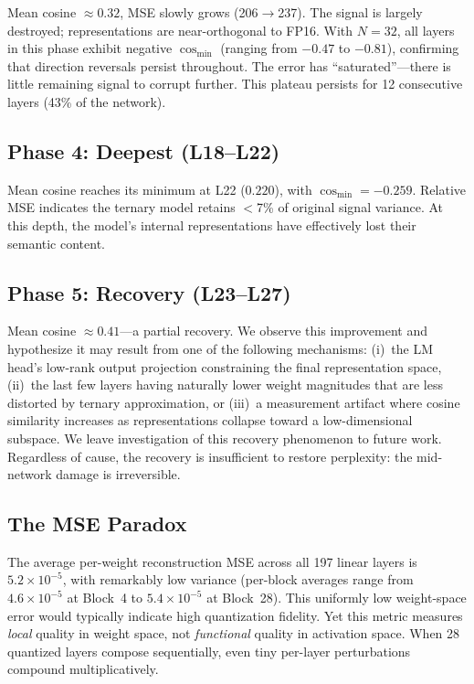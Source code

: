 \documentclass[10pt,a4paper]{article}
\begin{document}
Mean cosine $\approx 0.32$, MSE slowly grows (206$\to$237).
The signal is largely destroyed; representations are near-orthogonal to FP16.
With $N{=}32$, all layers in this phase exhibit negative $\cos_{\min}$ (ranging from $-0.47$ to $-0.81$), confirming that direction reversals persist throughout.
The error has ``saturated''---there is little remaining signal to corrupt further.
This plateau persists for 12 consecutive layers (43\% of the network).

\subsection{Phase 4: Deepest (L18--L22)}

Mean cosine reaches its minimum at L22 ($0.220$), with $\cos_{\min} = -0.259$.
Relative MSE indicates the ternary model retains $<$7\% of original signal variance.
At this depth, the model's internal representations have effectively lost their semantic content.

\subsection{Phase 5: Recovery (L23--L27)}

Mean cosine $\approx 0.41$---a partial recovery.
We observe this improvement and hypothesize it may result from one of the following mechanisms: (i)~the LM head's low-rank output projection constraining the final representation space, (ii)~the last few layers having naturally lower weight magnitudes that are less distorted by ternary approximation, or (iii)~a measurement artifact where cosine similarity increases as representations collapse toward a low-dimensional subspace.
We leave investigation of this recovery phenomenon to future work.
Regardless of cause, the recovery is insufficient to restore perplexity: the mid-network damage is irreversible.

\subsection{The MSE Paradox}

The average per-weight reconstruction MSE across all 197 linear layers is $5.2 \times 10^{-5}$, with remarkably low variance (per-block averages range from $4.6 \times 10^{-5}$ at Block~4 to $5.4 \times 10^{-5}$ at Block~28).
This uniformly low weight-space error would typically indicate high quantization fidelity.
Yet this metric measures \textit{local} quality in weight space, not \textit{functional} quality in activation space.
When 28 quantized layers compose sequentially, even tiny per-layer perturbations compound multiplicatively.
\end{document}
